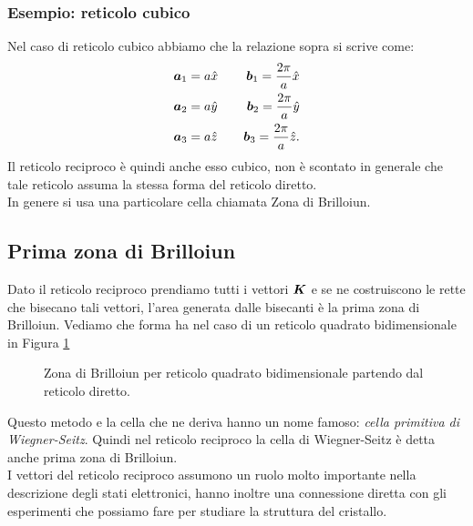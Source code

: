 \subsubsection{Esempio: reticolo cubico}
\label{subsubsec:Esempio: reticolo cubico}
Nel caso di reticolo cubico abbiamo che la relazione sopra si scrive come:
\[\begin{aligned}
	&\boldsymbol{a}_1=a \hat{x}&&		&\boldsymbol{b}_1=\frac{2\pi}{a}\hat{x}\\
	&\boldsymbol{a}_2=a \hat{y}&&		&\boldsymbol{b}_2=\frac{2\pi}{a}\hat{y}\\
	&\boldsymbol{a}_3=a \hat{z}&&		&\boldsymbol{b}_3=\frac{2\pi}{a}\hat{z}
.\end{aligned}\]
Il reticolo reciproco è quindi anche esso cubico, non è scontato in generale che tale reticolo assuma la stessa forma del reticolo diretto.\\
In genere si usa una particolare cella chiamata Zona di Brilloiun.
\subsection{Prima zona di Brilloiun}
\label{subsec:Zona di Brilloiun}
Dato il reticolo reciproco prendiamo tutti i vettori $\boldsymbol{K}$ e se ne costruiscono le rette che bisecano tali vettori, l'area generata dalle bisecanti è la prima zona di Brilloiun. Vediamo che forma ha nel caso di un reticolo quadrato bidimensionale in Figura \ref{fig:zona-di-brilloiun-per-reticolo-quadrato-bidimensionale}
\begin{figure}[ht]
    \centering
    \caption{\scriptsize Zona di Brilloiun per reticolo quadrato bidimensionale partendo
    dal reticolo diretto.}
    \label{fig:zona-di-brilloiun-per-reticolo-quadrato-bidimensionale}
\end{figure}
Questo metodo e la cella che ne deriva hanno un nome famoso: \textit{cella primitiva di Wiegner-Seitz}.
Quindi nel reticolo reciproco la cella di Wiegner-Seitz è detta anche prima zona di Brilloiun.\\
I vettori del reticolo reciproco assumono un ruolo molto importante nella descrizione degli stati elettronici, hanno inoltre una connessione diretta con gli esperimenti che possiamo fare per studiare la struttura del cristallo.

